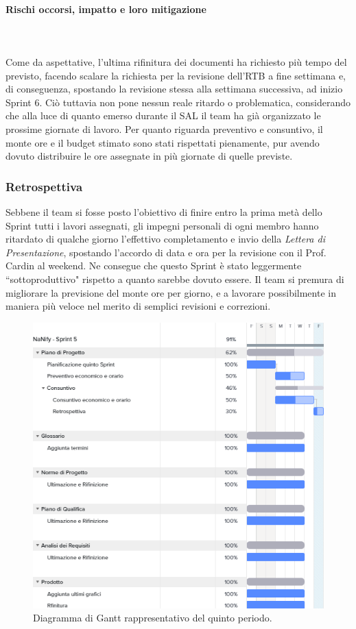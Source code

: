 \documentclass[8pt]{article}
\newcommand{\subsubsubsection}[1]{\paragraph{#1}\mbox{}\\}
\begin{document}
\subsubsubsection{Rischi occorsi, impatto e loro mitigazione}\\
Come da aspettative, l'ultima rifinitura dei documenti ha richiesto più tempo del previsto, facendo scalare la richiesta per la revisione dell'RTB a fine settimana e, di conseguenza,
spostando la revisione stessa alla settimana successiva, ad inizio Sprint 6. Ciò tuttavia non pone nessun reale ritardo o problematica, considerando che alla luce di quanto emerso durante il SAL il team ha già 
organizzato le prossime giornate di lavoro. Per quanto riguarda preventivo e consuntivo, il monte ore e il budget stimato sono stati rispettati pienamente, pur avendo dovuto distribuire 
le ore assegnate in più giornate di quelle previste. 

\subsubsection{Retrospettiva}

Sebbene il team si fosse posto l'obiettivo di finire entro la prima metà dello Sprint tutti i lavori assegnati, gli impegni personali di ogni membro hanno ritardato di qualche giorno l'effettivo completamento
e invio della \textit{Lettera di Presentazione}, spostando l'accordo di data e ora per la revisione con il Prof. Cardin al weekend. Ne consegue che questo Sprint è stato leggermente
``sottoproduttivo" rispetto a quanto sarebbe dovuto essere. Il team si premura di migliorare la previsione del monte ore per giorno, e a lavorare possibilmente in maniera più veloce nel merito di semplici revisioni e correzioni.

\begin{figure}[h!]
    \centering
    \includegraphics[width=13cm]{./images_pdp/gantt5.png}
    \caption{Diagramma di Gantt rappresentativo del quinto periodo.}
\end{figure}
\clearpage
\end{document}
